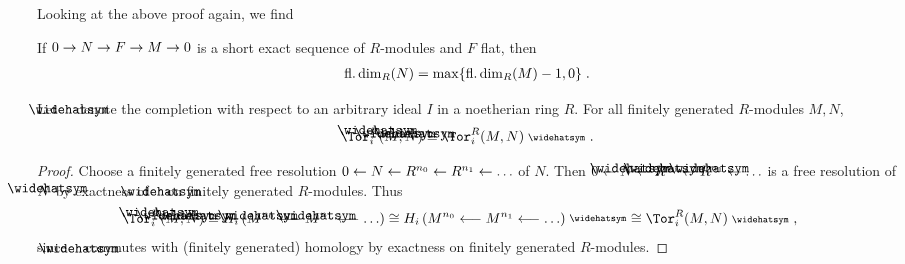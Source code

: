 \documentclass[a4paper,parskip=half,numbers=enddot, DIV=12]{scrreprt}
\begin{document}
Looking at the above proof again, we find
\begin{fact}
	If $0\morphism N\morphism F\morphism M\morphism 0$ is a short exact sequence of $R$-modules and $F$ flat, then 
	\begin{align*}
		\operatorname{fl.dim}_R(N)=\max\{\operatorname{fl.dim}_R(M)-1,0\}\;.
	\end{align*}
\end{fact}
\begin{prop}
	Let $\roof{\phantom{x}}$ denote the completion with respect to an arbitrary ideal $I$ in a noetherian ring $R$. For all finitely generated $R$-modules $M,N$,
	\begin{align*}
		\Tor_i^{\roof{R}}(\roof{M},\roof{N})\cong \Tor_i^R(M,N)^\complete \;.
	\end{align*}
\end{prop}
\begin{proof}
	Choose a finitely generated free resolution $0\lmorphism N\lmorphism R^{n_0}\lmorphism R^{n_1}\lmorphism\ldots$ of $N$. Then $0\lmorphism \roof{N}\lmorphism \roof{R}^{n_0}\lmorphism \roof{R}^{n_1}\lmorphism\ldots$ is a free resolution of $\roof{N}$ by exactness of $\roof{\phantom{x}}$ on finitely generated $R$-modules. Thus
	\begin{align*}
		\Tor_i^{\roof{R}}(\roof{M},\roof{N})&\cong H_i\left(\roof{M}^{n_0}\lmorphism \roof{M}^{n_1}\lmorphism\ldots\right)\cong  H_i\left(M^{n_0}\lmorphism M^{n_1}\lmorphism\ldots\right)^\complete \cong \Tor_i^R(M,N)^\complete \;,
	\end{align*}
	since $\roof{\phantom{x}}$ commutes with (finitely generated) homology by exactness on finitely generated $R$-modules.
\end{proof}
\end{document}
